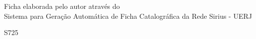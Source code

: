 %
% 


\begin{titlepage}
	\begin{center}
\vfill
\singlespacing
	\vspace*{75mm}
	{Ficha elaborada pelo autor através do\\ \vspace{1.5mm}
	 Sistema para Geração Automática de Ficha Catalográfica da Rede Sirius - UERJ}\\
	\vspace{1.5mm}
	\begin{boxedminipage}{140mm}
	\begin{minipage}{5mm}
		\vspace{-94mm}
		S725
	\end{minipage}
	\hfill
	\raisebox{8.5mm}{
	\begin{minipage}[top]{115mm}
		\vspace*{5mm}


\end{minipage}}
\end{boxedminipage}
\end{center}
\end{titlepage}
